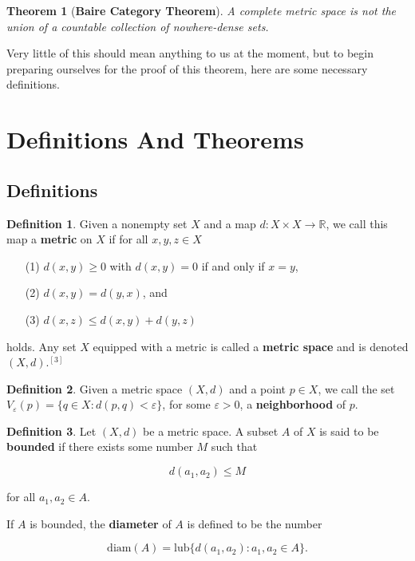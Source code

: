 \documentclass{article}
\newtheorem{theorem}{Theorem}[section]
\theoremstyle{definition}
\newtheorem{definition}{Definition}[section]
\theoremstyle{remark}
\theoremstyle{definition}
\begin{document}
\begin{theorem}[\textbf{Baire Category Theorem}] A complete metric space is not the union of a countable collection of nowhere-dense sets. 
\end{theorem}

\noindent Very little of this should mean anything to us at the moment, but to begin preparing ourselves for the proof of this theorem, here are some necessary definitions.

\newpage


\section{Definitions And Theorems}

\subsection{Definitions}

\begin{definition}
    Given a nonempty set $X$ and a map $d\colon X\times X\rightarrow\mathbb{R}$, we call this map a \textbf{metric} on $X$ if for all $x,y,z\in X$
    
    \begin{enumerate}
        \item[(1)] $d(x,y)\geq0$ with $d(x,y)=0$ if and only if $x=y$, 
        \item[(2)] $d(x,y)=d(y,x)$, and  
        \item[(3)] $d(x,z)\leq d(x,y)+d(y,z)$
    \end{enumerate}
    
    \noindent holds. Any set $X$ equipped with a metric is called a \textbf{metric space} and is denoted $(X,d)$.$^{[3]}$
\end{definition}

\begin{definition}
    Given a metric space $(X,d)$ and a point $p\in X$, we call the set $V_{\varepsilon}(p)=\{q\in X\colon d(p,q)<\varepsilon\}$, for some $\varepsilon>0$, a \textbf{neighborhood} of $p$.
\end{definition}

\begin{definition}
    Let $(X,d)$ be a metric space. A subset $A$ of $X$ is said to be \textbf{bounded} if there exists some number $M$ such that 
    
    \begin{equation*}
        d(a_1,a_2)\leq M
    \end{equation*}
    
    \noindent for all $a_1,a_2\in A$.
    
    If $A$ is bounded, the \textbf{diameter} of $A$ is defined to be the number
    
    \begin{equation*}
        \text{diam}(A)=\text{lub}\{d(a_1,a_2)\colon a_1,a_2\in A\}.
    \end{equation*}
\end{definition}
\end{document}
